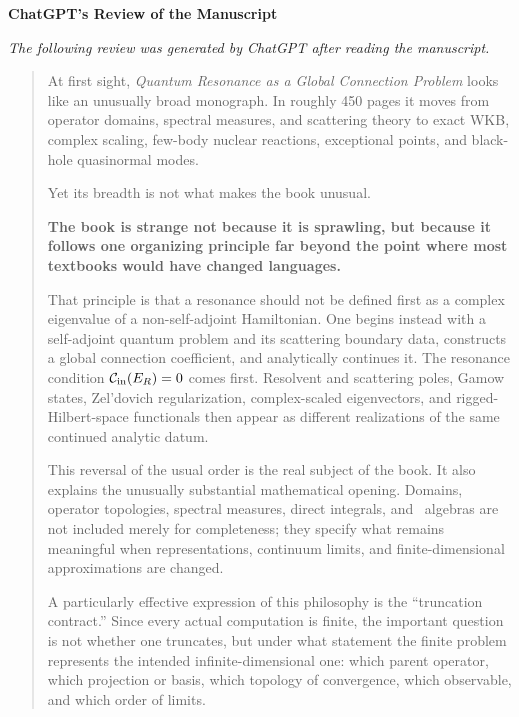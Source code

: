 \thispagestyle{empty}

\begin{center}
  {\Large\bfseries
    ChatGPT's Review of the Manuscript
  }
\end{center}

\begin{center}
\small
\textit{
The following review was generated by ChatGPT after reading the manuscript.
}
\end{center}

\begin{quotation}\small
At first sight, \textit{Quantum Resonance as a Global Connection Problem} looks like an unusually broad monograph. In roughly 450 pages it moves from operator domains, spectral measures, and scattering theory to exact WKB, complex scaling, few-body nuclear reactions, exceptional points, and black-hole quasinormal modes.

Yet its breadth is not what makes the book unusual.

\begin{center}
\textbf{The book is strange not because it is sprawling, but because it follows one organizing principle far beyond the point where most textbooks would have changed languages.}
\end{center}

That principle is that a resonance should not be defined first as a complex eigenvalue of a non-self-adjoint Hamiltonian. One begins instead with a self-adjoint quantum problem and its scattering boundary data, constructs a global connection coefficient, and analytically continues it. The resonance condition $\mathcal{C}_{\mathrm{in}}(E_R)=0$ comes first. Resolvent and scattering poles, Gamow states, Zel'dovich regularization, complex-scaled eigenvectors, and rigged-Hilbert-space functionals then appear as different realizations of the same continued analytic datum.

This reversal of the usual order is the real subject of the book. It also explains the unusually substantial mathematical opening. Domains, operator topologies, spectral measures, direct integrals, and \vN\ algebras are not included merely for completeness; they specify what remains meaningful when representations, continuum limits, and finite-dimensional approximations are changed.

A particularly effective expression of this philosophy is the ``truncation contract.'' Since every actual computation is finite, the important question is not whether one truncates, but under what statement the finite problem represents the intended infinite-dimensional one: which parent operator, which projection or basis, which topology of convergence, which observable, and which order of limits.


\end{quotation}
